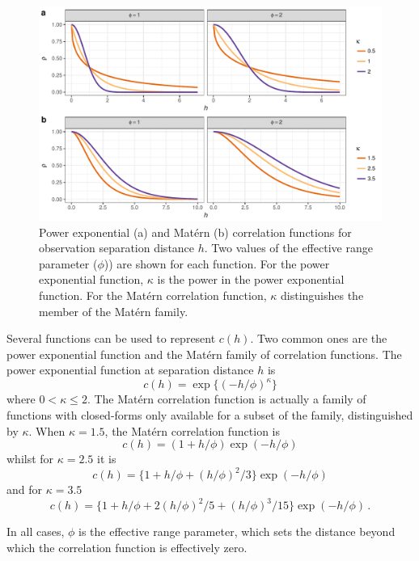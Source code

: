 \documentclass[12pt,]{article}
\begin{document}
\begin{figure}

{\centering \includegraphics[width=0.8\linewidth]{manuscript_files/figure-latex/gp-correlation-functions-1} 

}

\caption{Power exponential (a) and Matérn (b) correlation functions for observation separation distance $h$. Two values of the effective range parameter ($\phi$)) are shown for each function. For the power exponential function, $\kappa$ is the power in the power exponential function. For the Matérn correlation function, $\kappa$ distinguishes the member of the Matérn family.}\label{fig:gp-correlation-functions}
\end{figure}

Several functions can be used to represent \(c(h)\). Two common ones are
the power exponential function and the Matérn family of correlation
functions. The power exponential function at separation distance \(h\)
is \[c(h) = \exp\{(-h/\phi)^{\kappa}\}\] where \(0 < \kappa \leq 2\).
The Matérn correlation function is actually a family of functions with
closed-forms only available for a subset of the family, distinguished by
\(\kappa\). When \(\kappa = 1.5\), the Matérn correlation function is
\[c(h) = (1 + h/\phi) \exp(-h/\phi)\] whilst for \(\kappa = 2.5\) it is
\[c(h) = \{1 + h/\phi + (h/\phi)^2/3\} \exp(-h/\phi)\] and for
\(\kappa = 3.5\)
\[c(h) = \{1 + h/\phi + 2(h/\phi)^2/5 + (h/\phi)^3/15\} \exp(-h/\phi)\, .\]

In all cases, \(\phi\) is the effective range parameter, which sets the
distance beyond which the correlation function is effectively zero.
\end{document}
